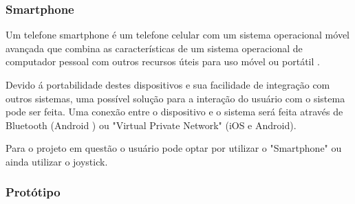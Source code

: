 \subsubsection{Smartphone}
Um telefone smartphone é um telefone celular com um sistema operacional móvel avançada que combina as características de um sistema operacional de computador pessoal com outros recursos úteis para uso móvel ou portátil \cite{article_smartphone}.

Devido á portabilidade destes dispositivos e sua facilidade de integração com outros sistemas, uma possível solução para a interação do usuário com o sistema pode ser feita. Uma conexão entre o dispositivo e o sistema será feita através de Bluetooth (Android ) ou "Virtual Private Network" (iOS e Android).

Para o projeto em questão o usuário pode optar por utilizar o "Smartphone" ou ainda utilizar o joystick.

\subsubsection{Protótipo}


